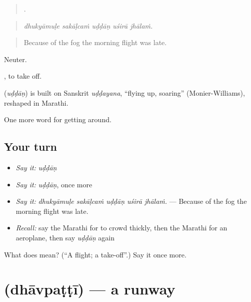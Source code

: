 \begin{quote}
    .
\end{quote}

\begin{quote}
\emph{dhukyāmuḷe sakāḷcaṁ uḍḍāṇ uśirā jhālaṁ.}
\end{quote}

\begin{quote}
Because of the fog the morning flight was late.
\end{quote}

Neuter.

 , to take off.

\begin{cousinweb}
\textbf{} (\emph{uḍḍāṇ}) is built on Sanskrit \emph{uḍḍayana}, \textquotedblleft{}flying up, soaring\textquotedblright{} (Monier-Williams), reshaped in Marathi.
\end{cousinweb}

\begin{grammarlens}[title={What you've built}]
One more word for getting around.
\end{grammarlens}

\subsection*{Your turn}
\begin{itemize}
\raggedright
  \item \emph{Say it:} \emph{uḍḍāṇ}
  \item \emph{Say it:} \emph{uḍḍāṇ}, once more
  \item \emph{Say it:} \emph{dhukyāmuḷe sakāḷcaṁ uḍḍāṇ uśirā jhālaṁ.} — Because of the fog the morning flight was late.
  \item \emph{Recall:} say the Marathi for to crowd thickly, then the Marathi for an aeroplane, then say \emph{uḍḍāṇ} again
\end{itemize}

\begin{tcolorbox}[breakable,colback=teal!4,colframe=teal!35!black,title={Before you move on}]
What does  mean? (\textquotedblleft{}A flight; a take-off\textquotedblright{}.) Say it once more.
\end{tcolorbox}
\section[\texorpdfstring{\mr{धावपट्टी} (dhāvpaṭṭī)}{धावपट्टी (dhāvpaṭṭī)}]{ (dhāvpaṭṭī) — a runway}

